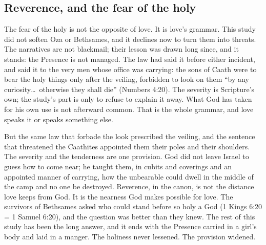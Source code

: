 \subsection{Reverence, and the fear of the holy}

The fear of the holy is not the opposite of love. It is love's
grammar. This study did not soften Oza or Bethsames, and it
declines now to turn them into threats. The narratives are not
blackmail; their lesson was drawn long since, and it stands: the
Presence is not managed. The law had said it before either incident, and said it to
the very men whose office was carrying: the sons of Caath were to bear
the holy things only after the veiling, forbidden to look on them ``by
any curiosity\ldots\ otherwise they shall die'' (Numbers
4:20). The severity is Scripture's own; the study's
part is only to refuse to explain it away. What God has taken for his
own use is not afterward common. That is the whole grammar, and love
speaks it or speaks something else.

But the same law that forbade the look prescribed the veiling, and the
sentence that threatened the Caathites appointed them their poles and
their shoulders. The severity and the tenderness are one provision.
God did not leave Israel to guess how to come near; he taught them, in
cubits and coverings and an appointed manner of carrying, how the
unbearable could dwell in the middle of the camp and no one be
destroyed. Reverence, in the canon, is not the distance love keeps
from God. It is the nearness God makes possible for love. The
survivors of Bethsames asked who could stand before so holy a God
(1 Kings 6:20 = 1 Samuel 6:20), and the question was better than they
knew. The rest of this study has been the long answer, and it ends
with the Presence carried in a girl's body and laid in a manger. The
holiness never lessened. The provision widened.

